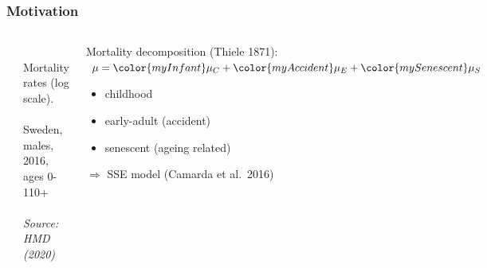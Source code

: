 \documentclass[12pt, xcolor=table]{beamer}  %
\begin{document}
\begin{frame}[noframenumbering]\frametitle{Motivation}
	\vspace{-0.05cm}
	
	\begin{columns}
		\begin{center}
			\includegraphics[scale=.27]{Figures/Ch3/F7_3}
		\end{center}
		
		\vspace{-0.15cm}
		\tiny $\quad\quad\quad$ Mortality rates (log scale). \\
		$\quad\quad\quad$ Sweden, males, 2016, ages 0-110+ \\ $\quad\quad\quad$ \textit{Source: HMD (2020)}
		
		
		\begin{center}
			Mortality decomposition {\scriptsize(Thiele 1871)}: $\mu = {\color{myInfant}\mu_C} + {\color{myAccident}\mu_E} + {\color{mySenescent}\mu_S}$
			\bigskip
			\begin{itemize}
				\item {\color{myInfant} childhood}
				\bigskip
				\item {\color{myAccident} early-adult (accident)}
				\bigskip
				\item {\color{mySenescent} senescent (ageing related)}
				\bigskip
			\end{itemize}
			\vspace{0.15cm}
			$\Rightarrow$ SSE model {\scriptsize (Camarda et al.~2016)}
		\end{center}		
		
	\end{columns}
	
	
\end{frame}
\end{document}
